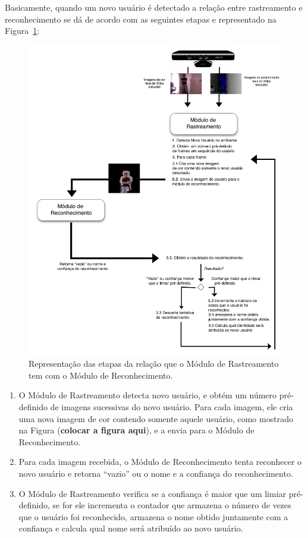 	Basicamente, quando um novo usuário é detectado a relação entre rastreamento e reconhecimento se dá de acordo com as seguintes etapas e representado na Figura~\ref{fig:rastreamento-reconhecimento}:

		\begin{figure}[hbt]
			\begin{center}
				\includegraphics[scale=1.5]{figuras/4.ProblemaEProposta/esquema-tracker-reco.png}
			\end{center}
			\caption{Representação das etapas da relação que o Módulo de Rastreamento tem com o Módulo de Reconhecimento.}
			\label{fig:rastreamento-reconhecimento}
		\end{figure}
	
		\begin{enumerate}
		 	\item O Módulo de Rastreamento detecta novo usuário, e obtém um número pré-definido de imagens sucessivas do novo usuário. Para cada imagem, ele cria uma nova imagem de cor contendo somente aquele usuário, como mostrado na Figura (\textbf{colocar a figura aqui}), e a envia para o Módulo de Reconhecimento.
		 	\item Para cada imagem recebida, o Módulo de Reconhecimento tenta reconhecer o novo usuário e retorna ``vazio'' ou o nome e a confiança do reconhecimento.
		 	\item O Módulo de Rastreamento verifica se a confiança é maior que um limiar pré-definido, se for ele incrementa o contador que armazena o número de vezes que o usuário foi reconhecido, armazena o nome obtido juntamente com a confiança e calcula qual nome será atribuído ao novo usuário.
	 	\end{enumerate} 
	
